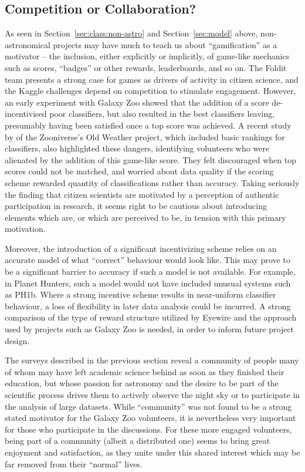 \documentclass{ar2e}
\def\Sref#1{Section~\ref{#1}\xspace}
\begin{document}

\subsection{Competition or Collaboration?}
\label{sec:crowd:gamification}

As seen in \Sref{sec:class:non-astro} and \Sref{sec:model}  above,
non-astronomical projects may have much to teach us about ``gamification'' as
a motivator -- the inclusion, either explicitly or implicitly, of game-like
mechanics such as scores, ``badges'' or other rewards, leaderboards, and so
on. The Foldit team presents a strong case for games as drivers of activity in
citizen science, and the Kaggle challenges depend on competition to stimulate
engagement. However, an early experiment with Galaxy Zoo showed that the
addition of a score de-incentivised poor classifiers, but also resulted in the
best classifiers leaving, presumably having been satisfied once a top score
was achieved. A recent study by \citet{Eveleigh++2013} of the Zooniverse's Old
Weather project, which included basic rankings for classifiers, also
highlighted these dangers, identifying volunteers who were alienated by the
addition of this game-like score. They felt discouraged when top scores could
not be matched, and worried about data quality if the scoring scheme rewarded
quantity of classifications rather than accuracy. Taking seriously the finding
that citizen scientists are motivated by a perception of authentic
participation in research, it seems right to be cautious about introducing
elements which are, or which are perceived to be, in tension with this primary
motivation. 

Moreover, the introduction of a significant incentivizing scheme relies on an
accurate model of what ``correct'' behaviour would look like. This may prove
to be a significant barrier to accuracy if such a model is not available. For
example, in Planet Hunters, such a model would not have included unusual
systems such as PH1b. Where a strong incentive scheme results in near-uniform
classifier behaviour, a loss of flexibility in later data analysis could be
incurred.  A strong comparison of the type of reward structure utilized by
Eyewire and the approach used by projects such as Galaxy Zoo is needed, in
order to inform future project design. 

The surveys described in the previous section reveal a community of people
many of whom may have left academic science behind as soon as they finished
their education, but whose passion for astronomy and the desire to be part of
the scientific process drives them to actively observe the night sky or to
participate in the analysis of large datasets.  While ``community'' was not
found to be a strong stated motivator for the Galaxy Zoo volunteers, it is
nevertheless very important for those who participate in the discussions. For
these more engaged volunteers, being part of a community (albeit a distributed
one) seems to bring great enjoyment and satisfaction, as they unite under this
shared interest which may be far removed from their ``normal''  lives. 
\end{document}
